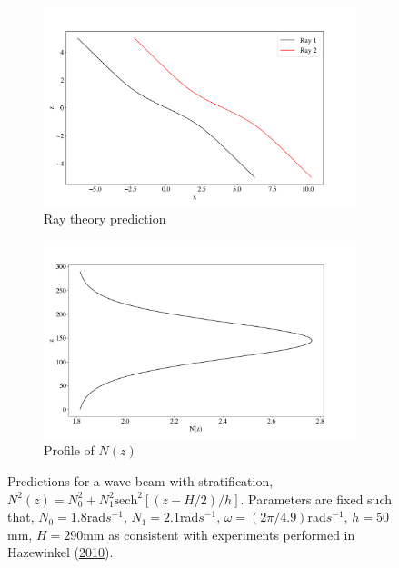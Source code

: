 \documentclass[a4paper]{article}
\numberwithin{equation}{section}
\begin{document}
\begin{figure}[h!]
\centering
\begin{subfigure}[t]{.5\textwidth}
  \centering
  \includegraphics[width=1.1\linewidth]{Images/curve}
  \caption{Ray theory prediction}
  \label{fig:sub1}
\end{subfigure}%
\begin{subfigure}[t]{.5\textwidth}
  \centering
  \includegraphics[width=1.1\linewidth]{Images/stratification}
  \caption{Profile of $N(z)$}
  \label{fig:sub2}
\end{subfigure}
\caption{Predictions for a wave beam with stratification, $N^2(z) = N^2_0 + N^2_1 \text{sech}^2[(z-H/2)/h]$. Parameters are fixed such that, $N_0 = 1.8$rad$s^{-1}$, $N_1 = 2.1$rad$s^{-1}$, $\omega = (2\pi/4.9)$rad$s^{-1}$, $h = 50$mm, $H=290$mm as consistent with experiments performed in Hazewinkel (\protect\hyperlink{ref 24}{2010}).}
\label{fig:10}
\end{figure}
\end{document}
